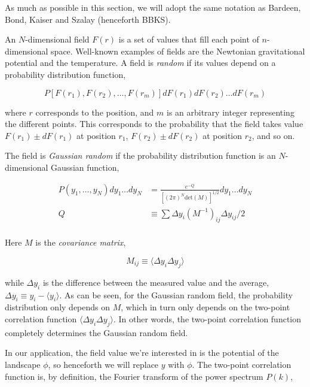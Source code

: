 \documentclass[12pt]{article}
\begin{document}
As much as possible in this section, we will adopt the same notation as Bardeen, Bond, Kaiser and Szalay (henceforth BBKS). \cite{BBKS}

An $N$-dimensional field $F(r)$ is a set of values that fill each point of $n$-dimensional space. Well-known examples of fields are the Newtonian gravitational potential and the temperature. A field is \emph{random} if its values depend on a probability distribution function,

\begin{equation}
P[F(r_1), F(r_2), \ldots, F(r_m)]dF(r_1)dF(r_2)\ldots dF(r_m)
\end{equation}

\noindent where $r$ corresponds to the position, and $m$ is an arbitrary integer representing the different points. This corresponds to the probability that the field takes value $F(r_1) \pm dF(r_1)$ at position $r_1$, $F(r_2) \pm dF(r_2)$ at position $r_2$, and so on. 

The field is \emph{Gaussian random} if the probability distribution function is an $N$-dimensional Gaussian function,

\begin{equation} \label{MultivariateGaussian}
\begin{split}
P(y_1,\ldots,y_N)dy_1\ldots dy_N &= \frac{e^{-Q}}{[(2\pi)^N \mathrm{det}(M)]^{1/2}} dy_1\ldots dy_N\\
Q &\equiv \sum \Delta y_i (M^{-1})_{ij} \Delta y_{ij} / 2 \\
\end{split}
\end{equation}

Here $M$ is the \emph{covariance matrix}, 

\begin{equation}
M_{ij} \equiv \langle \Delta y_i \Delta y_j \rangle
\end{equation}

\noindent while $\Delta y_i$ is the difference between the measured value and the average, $\Delta y_i \equiv y_i - \langle y_i \rangle$. As can be seen, for the Gaussian random field, the probability distribution only depends on $M$, which in turn only depends on the two-point correlation function $\langle \Delta y_i \Delta y_j \rangle$. In other words, the two-point correlation function completely determines the Gaussian random field.

In our application, the field value we're interested in is the potential of the landscape $\phi$, so henceforth we will replace $y$ with $\phi$. The two-point correlation function is, by definition, the Fourier transform of the power spectrum $P(k)$,
\end{document}
